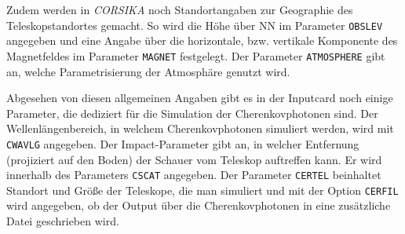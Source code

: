 Zudem werden in \textit{CORSIKA} noch Standortangaben zur Geographie des Teleskopstandortes gemacht.
So wird die Höhe über NN im Parameter \texttt{OBSLEV} angegeben und eine Angabe über die horizontale, bzw. vertikale Komponente des Magnetfeldes im Parameter \texttt{MAGNET} festgelegt.
Der Parameter \texttt{ATMOSPHERE} gibt an, welche Parametrisierung der Atmosphäre genutzt wird.\cite{CORSIKA-Handbook}

Abgesehen von diesen allgemeinen Angaben gibt es in der Inputcard noch einige Parameter, die dediziert für die Simulation der Cherenkovphotonen sind.
Der Wellenlängenbereich, in welchem Cherenkovphotonen simuliert werden, wird mit \texttt{CWAVLG} angegeben.
Der Impact-Parameter gibt an, in welcher Entfernung (projiziert auf den Boden) der Schauer vom Teleskop auftreffen kann. 
Er wird innerhalb des Parameters \texttt{CSCAT} angegeben.
Der Parameter \texttt{CERTEL} beinhaltet Standort und Größe der Teleskope, die man simuliert und mit der Option \texttt{CERFIL} wird angegeben, ob der Output über die Cherenkovphotonen in eine zusätzliche Datei geschrieben wird.


